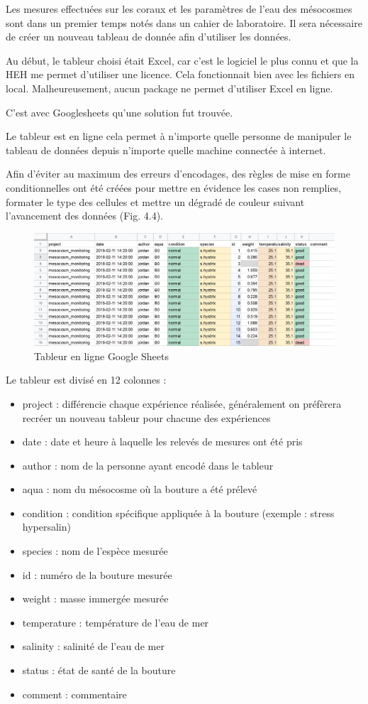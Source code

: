 \documentclass[]{article}
\providecommand{\tightlist}{%
  \setlength{\itemsep}{0pt}\setlength{\parskip}{0pt}}
\begin{document}
Les mesures effectuées sur les coraux et les paramètres de l'eau des
mésocosmes sont dans un premier temps notés dans un cahier de
laboratoire. Il sera nécessaire de créer un nouveau tableau de donnée
afin d'utiliser les données.

Au début, le tableur choisi était Excel, car c'est le logiciel le plus
connu et que la HEH me permet d'utiliser une licence. Cela fonctionnait
bien avec les fichiers en local. Malheureusement, aucun package ne
permet d'utiliser Excel en ligne.

C'est avec Googlesheets qu'une solution fut trouvée.

Le tableur est en ligne cela permet à n'importe quelle personne de
manipuler le tableau de données depuis n'importe quelle machine
connectée à internet.

Afin d'éviter au maximum des erreurs d'encodages, des règles de mise en
forme conditionnelles ont été créées pour mettre en évidence les cases
non remplies, formater le type des cellules et mettre un dégradé de
couleur suivant l'avancement des données (Fig. 4.4).

\begin{figure}[h!]
\includegraphics[]{../image/tableur-gs.PNG}
\caption{Tableur en ligne Google Sheets}
\end{figure}

Le tableur est divisé en 12 colonnes :

\begin{itemize}
\tightlist
\item
  project : différencie chaque expérience réalisée, généralement on
  préfèrera recréer un nouveau tableur pour chacune des expériences
\item
  date : date et heure à laquelle les relevés de mesures ont été pris
\item
  author : nom de la personne ayant encodé dans le tableur
\item
  aqua : nom du mésocosme où la bouture a été prélevé
\item
  condition : condition spécifique appliquée à la bouture (exemple :
  stress hypersalin)
\item
  species : nom de l'espèce mesurée
\item
  id : numéro de la bouture mesurée
\item
  weight : masse immergée mesurée
\item
  temperature : température de l'eau de mer
\item
  salinity : salinité de l'eau de mer
\item
  status : état de santé de la bouture
\item
  comment : commentaire
\end{itemize}
\end{document}
